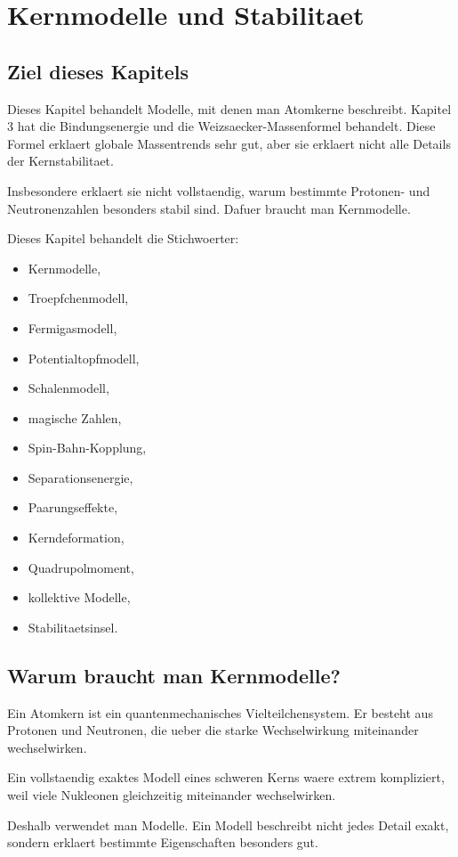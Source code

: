 \chapter{Kernmodelle und Stabilitaet}

\section{Ziel dieses Kapitels}

Dieses Kapitel behandelt Modelle, mit denen man Atomkerne beschreibt.
Kapitel 3 hat die Bindungsenergie und die Weizsaecker-Massenformel behandelt.
Diese Formel erklaert globale Massentrends sehr gut, aber sie erklaert nicht alle
Details der Kernstabilitaet.

Insbesondere erklaert sie nicht vollstaendig, warum bestimmte Protonen- und
Neutronenzahlen besonders stabil sind.
Dafuer braucht man Kernmodelle.

\begin{notebox}
Dieses Kapitel behandelt die Stichwoerter:
\begin{itemize}
    \item Kernmodelle,
    \item Troepfchenmodell,
    \item Fermigasmodell,
    \item Potentialtopfmodell,
    \item Schalenmodell,
    \item magische Zahlen,
    \item Spin-Bahn-Kopplung,
    \item Separationsenergie,
    \item Paarungseffekte,
    \item Kerndeformation,
    \item Quadrupolmoment,
    \item kollektive Modelle,
    \item Stabilitaetsinsel.
\end{itemize}
\end{notebox}

\section{Warum braucht man Kernmodelle?}

Ein Atomkern ist ein quantenmechanisches Vielteilchensystem.
Er besteht aus Protonen und Neutronen, die ueber die starke Wechselwirkung
miteinander wechselwirken.

\begin{conceptbox}
Ein vollstaendig exaktes Modell eines schweren Kerns waere extrem kompliziert,
weil viele Nukleonen gleichzeitig miteinander wechselwirken.

Deshalb verwendet man Modelle.
Ein Modell beschreibt nicht jedes Detail exakt, sondern erklaert bestimmte
Eigenschaften besonders gut.
\end{conceptbox}

